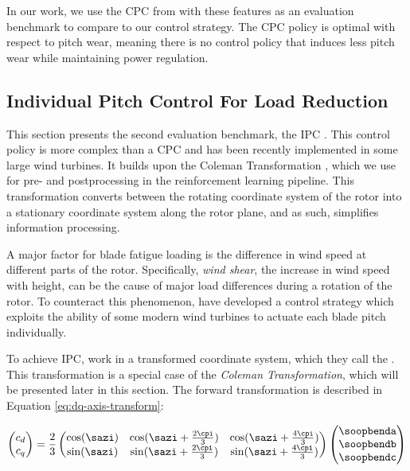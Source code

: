 In our work, we use the CPC from \citet{perez-beckerImplementationValidationAdvanced2021} with these features as an evaluation benchmark to compare to our control strategy. The CPC policy is optimal with respect to pitch wear, meaning there is no control policy that induces less pitch wear while maintaining power regulation.

\subsection{Individual Pitch Control For Load Reduction}
\label{section:background-ipc}

\begin{summary}
This section presents the second evaluation benchmark, the \acf{IPC} \cite{bossanyiIndividualBladePitch2003}. This control policy is more complex than a \ac{CPC} and has been recently implemented in some large wind turbines. It builds upon the Coleman Transformation \cite{birMultibladeCoordinateTransformation2008}, which we use for pre- and postprocessing in the reinforcement learning pipeline. This transformation converts between the rotating coordinate system of the rotor into a stationary coordinate system along the rotor plane, and as such, simplifies information processing.
\end{summary}

A major factor for blade fatigue loading is the difference in wind speed at different parts of the rotor. Specifically, \textit{wind shear}, the increase in wind speed with height, can be the cause of major load differences during a rotation of the rotor. \cite[Chapter 2.6.2]{burtonWindEnergyHandbook2011} To counteract this phenomenon, \citet{bossanyiIndividualBladePitch2003} \cite{bossanyiFurtherLoadReductions2005} have developed a control strategy which exploits the ability of some modern wind turbines to actuate each blade pitch individually.

To achieve \acf{IPC}, \citet{bossanyiIndividualBladePitch2003} work in a transformed coordinate system, which they call the . This transformation is a special case of the \textit{Coleman Transformation}, which will be presented later in this section. The forward transformation is described in Equation \ref{eq:dq-axis-transform}:

\begin{equation}
\begin{pmatrix}
  c_d \\ c_q
\end{pmatrix}
=
\frac{2}{3}
\begin{pmatrix}
  \cos(\sazi) & \cos(\sazi + \frac{2 \cpi}{3}) & \cos(\sazi + \frac{4 \cpi}{3}) \\
  \sin(\sazi) & \sin(\sazi + \frac{2 \cpi}{3}) & \sin(\sazi + \frac{4 \cpi}{3})
\end{pmatrix}
\begin{pmatrix}
  \soopbenda \\
  \soopbendb \\
  \soopbendc
\end{pmatrix}
\label{eq:dq-axis-transform}
\end{equation}

